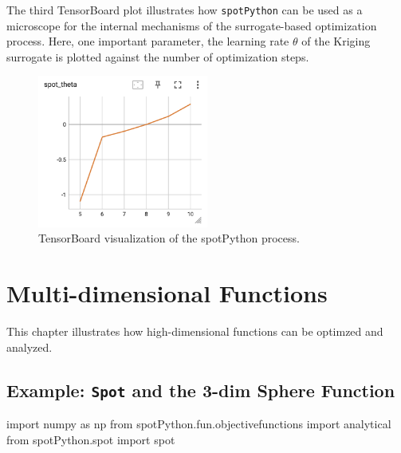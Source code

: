 \documentclass[
  letterpaper,
  DIV=11,
  numbers=noendperiod]{scrreprt}
\newenvironment{Shaded}{\begin{snugshade}}{\end{snugshade}}
\newcommand{\ImportTok}[1]{\textcolor[rgb]{0.00,0.46,0.62}{#1}}
\newcommand{\NormalTok}[1]{\textcolor[rgb]{0.00,0.23,0.31}{#1}}
\begin{document}
The third TensorBoard plot illustrates how \texttt{spotPython} can be
used as a microscope for the internal mechanisms of the surrogate-based
optimization process. Here, one important parameter, the learning rate
\(\theta\) of the Kriging surrogate is plotted against the number of
optimization steps.

\begin{figure}

{\centering \includegraphics[width=0.5\textwidth,height=\textheight]{figures_static/01_tensorboard_03.png}

}

\caption{TensorBoard visualization of the spotPython process.}

\end{figure}

\hypertarget{sec-multi-dim}{%
\chapter{Multi-dimensional Functions}\label{sec-multi-dim}}

This chapter illustrates how high-dimensional functions can be optimzed
and analyzed.

\hypertarget{example-spot-and-the-3-dim-sphere-function}{%
\section{\texorpdfstring{Example: \texttt{Spot} and the 3-dim Sphere
Function}{Example: Spot and the 3-dim Sphere Function}}\label{example-spot-and-the-3-dim-sphere-function}}

\begin{Shaded}
\begin{Highlighting}[]
\ImportTok{import}\NormalTok{ numpy }\ImportTok{as}\NormalTok{ np}
\ImportTok{from}\NormalTok{ spotPython.fun.objectivefunctions }\ImportTok{import}\NormalTok{ analytical}
\ImportTok{from}\NormalTok{ spotPython.spot }\ImportTok{import}\NormalTok{ spot}
\end{Highlighting}
\end{Shaded}
\end{document}
